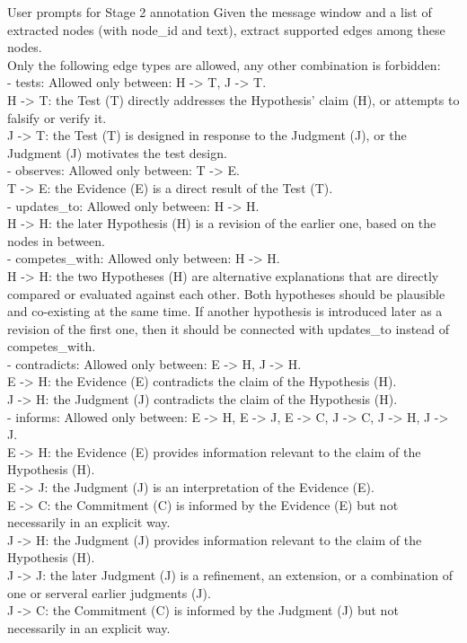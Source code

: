 \begin{hypobox}{User prompts for Stage 2 annotation}
Given the message window and a list of extracted nodes (with node\_id and text), extract supported edges among these nodes.\\


Only the following edge types are allowed, any other combination is forbidden:\\
- tests: Allowed only between: H -> T, J -> T.\\
    H -> T: the Test (T) directly addresses the Hypothesis' claim (H), or attempts to falsify or verify it.\\
    J -> T: the Test (T) is designed in response to the Judgment (J), or the Judgment (J) motivates the test design.\\
- observes: Allowed only between: T -> E.\\
    T -> E: the Evidence (E) is a direct result of the Test (T).\\
- updates\_to: Allowed only between: H -> H.\\
    H -> H: the later Hypothesis (H) is a revision of the earlier one, based on the nodes in between.\\
- competes\_with: Allowed only between: H -> H.\\
    H -> H: the two Hypotheses (H) are alternative explanations that are directly compared or evaluated against each other. Both hypotheses should be plausible and co-existing at the same time. If another hypothesis is introduced later as a revision of the first one, then it should be connected with updates\_to instead of competes\_with.\\
- contradicts: Allowed only between: E -> H, J -> H.\\
    E -> H: the Evidence (E) contradicts the claim of the Hypothesis (H).\\
    J -> H: the Judgment (J) contradicts the claim of the Hypothesis (H).\\
- informs: Allowed only between: E -> H, E -> J, E -> C, J -> C, J -> H, J -> J.\\
    E -> H: the Evidence (E) provides information relevant to the claim of the Hypothesis (H).\\
    E -> J: the Judgment (J) is an interpretation of the Evidence (E).\\
    E -> C: the Commitment (C) is informed by the Evidence (E) but not necessarily in an explicit way.\\
    J -> H: the Judgment (J) provides information relevant to the claim of the Hypothesis (H).\\
    J -> J: the later Judgment (J) is a refinement, an extension, or a combination of one or serveral earlier judgments (J).\\
    J -> C: the Commitment (C) is informed by the Judgment (J) but not necessarily in an explicit way.\\



\end{hypobox}
